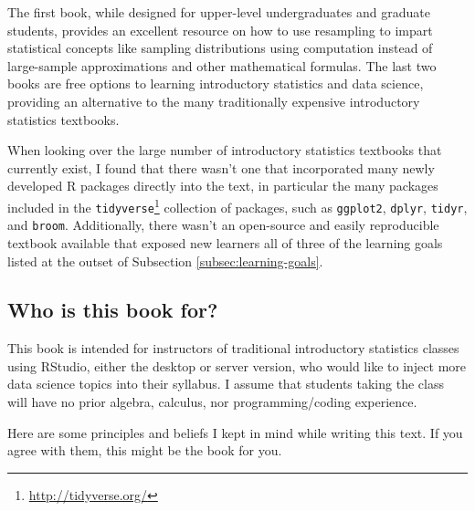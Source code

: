 \documentclass[
  12pt, krantz2,
]{krantz}
\renewcommand{\href}[2]{#2\footnote{\url{#1}}}
\begin{document}
The first book, while designed for upper-level undergraduates and graduate students, provides an excellent resource on how to use resampling to impart statistical concepts like sampling distributions using computation instead of large-sample approximations and other mathematical formulas. The last two books are free options to learning introductory statistics and data science, providing an alternative to the many traditionally expensive introductory statistics textbooks.

When looking over the large number of introductory statistics textbooks that currently exist, I found that there wasn't one that incorporated many newly developed R packages directly into the text, in particular the many packages included in the \href{http://tidyverse.org/}{\texttt{tidyverse}} collection of packages, such as \texttt{ggplot2}, \texttt{dplyr}, \texttt{tidyr}, and \texttt{broom}. Additionally, there wasn't an open-source and easily reproducible textbook available that exposed new learners all of three of the learning goals listed at the outset of Subsection \ref{subsec:learning-goals}.

\hypertarget{who-is-this-book-for}{%
\subsection{Who is this book for?}\label{who-is-this-book-for}}

This book is intended for instructors of traditional introductory statistics classes using RStudio, either the desktop or server version, who would like to inject more data science topics into their syllabus. I assume that students taking the class will have no prior algebra, calculus, nor programming/coding experience.

Here are some principles and beliefs I kept in mind while writing this text. If you agree with them, this might be the book for you.
\end{document}
